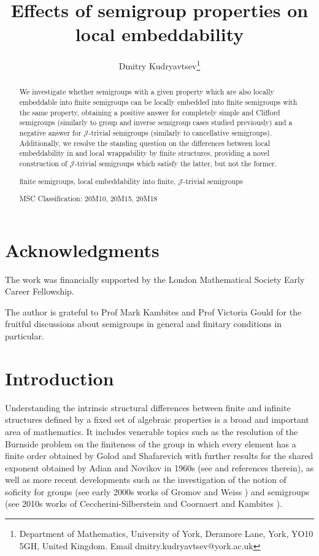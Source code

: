 \documentclass{article}
\theoremstyle{definition}
\def\J{\mathcal J}
\begin{document}
\title{Effects of semigroup properties on local embeddability}

\author{Dmitry Kudryavtsev\footnote{Department of Mathematics, University of York, Deramore Lane, York, YO10 5GH, United Kingdom. Email dmitry.kudryavtsev@york.ac.uk}}

\maketitle

\begin{abstract}

We investigate whether semigroups with a given property which are also locally embeddable into finite semigroups can be locally embedded into finite semigroups with the same property, obtaining a positive answer for completely simple and Clifford semigroups (similarly to group and inverse semigroup cases studied previously) and a negative answer for $\J$-trivial semigroups (similarly to cancellative semigroups). Additionally, we resolve the standing question on the differences between local embeddability in and local wrappability by finite structures, providing a novel construction of $\J$-trivial semigroups which satisfy the latter, but not the former.

finite semigroups, local embeddability into finite, $\J$-trivial semigroups

MSC Classification: 20M10, 20M15, 20M18

\end{abstract}

\section*{Acknowledgments}

The work was financially supported by the London Mathematical Society Early Career Fellowship.

The author is grateful to Prof Mark Kambites and Prof Victoria Gould for the fruitful discussions about semigroups in general and finitary conditions in particular.

\section*{Introduction}

Understanding the intrinsic structural differences between finite and infinite structures defined by a fixed set of algebraic properties is a broad and important area of mathematics. It includes venerable topics such as the resolution of the Burnside problem on the finiteness of the group in which every element has a finite order obtained by Golod and Shafarevich with further results for the shared exponent obtained by Adian and Novikov in 1960s (see \cite{Adi} and references therein), as well as more recent developments such as the investigation of the notion of soficity for groups (see early 2000s works of Gromov \cite{Gro} and Weiss \cite{Wei}) and semigroups (see 2010s works of Ceccherini-Silberstein and Coornaert \cite{CSC} and Kambites \cite{Kam}). 
\end{document}
